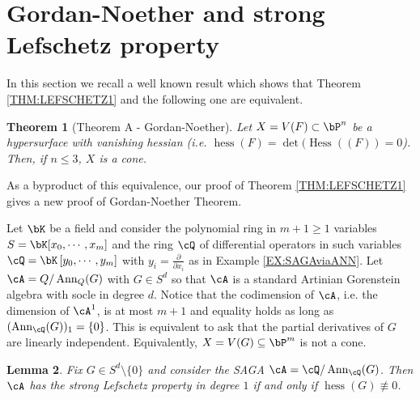 \documentclass[a4paper,11pt]{amsart}
\newtheorem{theorem}{Theorem}[section]
\newtheorem{lemma}[theorem]{Lemma}
\DeclareMathOperator{\Ann}{Ann}
\DeclareMathOperator{\Hess}{Hess}
\DeclareMathOperator{\hess}{hess}
\begin{document}
\section{Gordan-Noether and strong Lefschetz property}
\label{SEC:3}

In this section we recall a well known result which shows that Theorem \ref{THM:LEFSCHETZ1} and the following one are equivalent. 

\begin{theorem}[Theorem A - Gordan-Noether]
\label{THM:GN}
Let $X=V(F)\subset \bP^n$ be a hypersurface with vanishing hessian (i.e. $\hess(F)=\det(\Hess((F))=0$). Then, if $n\le 3$, $X$ is a cone.
\end{theorem}

As a byproduct of this equivalence, our proof of Theorem \ref{THM:LEFSCHETZ1} gives a new proof of Gordan-Noether Theorem.
\vspace{2mm}

Let $\bK$ be a field and consider the polynomial ring in $m+1\geq1$ variables $S=\bK[x_0,\cdots,x_m]$ and the ring $\cQ$ of differential operators in such variables $\cQ=\bK\left[y_0,\cdots,y_m\right]$ with $y_i=\frac{\partial}{\partial x_i}$ as in Example \ref{EX:SAGAviaANN}. Let $\cA=Q/\Ann_Q(G)$ with $G\in S^d$ so that $\cA$ is a standard Artinian Gorenstein algebra with socle in degree $d$. Notice that the codimension of $\cA$, i.e. the dimension of $\cA^1$, is at most $m+1$ and equality holds as long as $(\Ann_{\cQ}(G))_1=\{0\}$. This is equivalent to ask that the partial derivatives of $G$ are linearly independent. Equivalently, $X=V(G)\subseteq \bP^m$ is not a cone.



\begin{lemma}
\label{LEM:EQUIVHESS0}
Fix $G\in S^d\setminus\{0\}$ and consider the SAGA $\cA=\cQ/\Ann_{\cQ}(G)$. Then $\cA$ has the strong Lefschetz property in degree $1$ if and only if $\hess(G)\not\equiv 0$. 
\end{lemma}
\end{document}
